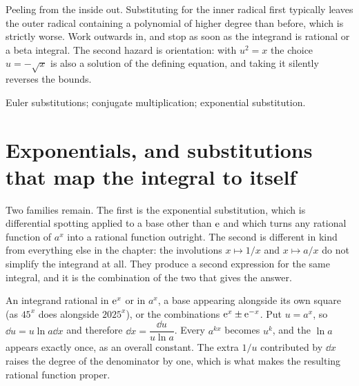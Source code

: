 \begin{trap}
Peeling from the inside out. Substituting for the inner radical first typically leaves the outer radical containing a polynomial of higher degree than before, which is strictly worse. Work outwards in, and stop as soon as the integrand is rational or a beta integral. The second hazard is orientation: with $u^2=x$ the choice $u=-\sqrt x$ is also a solution of the defining equation, and taking it silently reverses the bounds.
\end{trap}

\begin{seealsob}Euler substitutions; conjugate multiplication; exponential substitution.\end{seealsob}

\section{Exponentials, and substitutions that map the integral to itself}

Two families remain. The first is the exponential substitution, which is differential spotting applied to a base other than $\mathrm{e}$ and which turns any rational function of $a^x$ into a rational function outright. The second is different in kind from everything else in the chapter: the involutions $x\mapsto1/x$ and $x\mapsto a/x$ do not simplify the integrand at all. They produce a second expression for the same integral, and it is the combination of the two that gives the answer.

\cue An integrand rational in $\mathrm{e}^x$ or in $a^x$, a base appearing alongside its own square (as $45^x$ does alongside $2025^x$), or the combinations $\mathrm{e}^x\pm\mathrm{e}^{-x}$.
\method Put $u=a^x$, so $\dd u=u\ln a\dd x$ and therefore $\dd x=\dfrac{\dd u}{u\ln a}$. Every $a^{kx}$ becomes $u^k$, and the $\ln a$ appears exactly once, as an overall constant. The extra $1/u$ contributed by $\dd x$ raises the degree of the denominator by one, which is what makes the resulting rational function proper.

